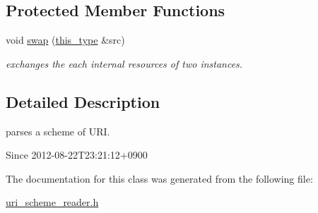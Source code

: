 \subsection*{Protected Member Functions}
\begin{DoxyCompactItemize}
\item 
\hypertarget{classhryky_1_1uri_1_1scheme_1_1_reader_a6b7c635d0060515e333eb5d67e9e9182}{void \hyperlink{classhryky_1_1uri_1_1scheme_1_1_reader_a6b7c635d0060515e333eb5d67e9e9182}{swap} (\hyperlink{classhryky_1_1uri_1_1scheme_1_1_reader_a06f7352c04d11e56624f3fe26280411f}{this\-\_\-type} \&src)}\label{classhryky_1_1uri_1_1scheme_1_1_reader_a6b7c635d0060515e333eb5d67e9e9182}

\begin{DoxyCompactList}\small\item\em exchanges the each internal resources of two instances. \end{DoxyCompactList}\end{DoxyCompactItemize}


\subsection{Detailed Description}
parses a scheme of U\-R\-I. 

\begin{DoxySince}{Since}
2012-\/08-\/22\-T23\-:21\-:12+0900 
\end{DoxySince}


The documentation for this class was generated from the following file\-:\begin{DoxyCompactItemize}
\item 
\hyperlink{uri__scheme__reader_8h}{uri\-\_\-scheme\-\_\-reader.\-h}\end{DoxyCompactItemize}
